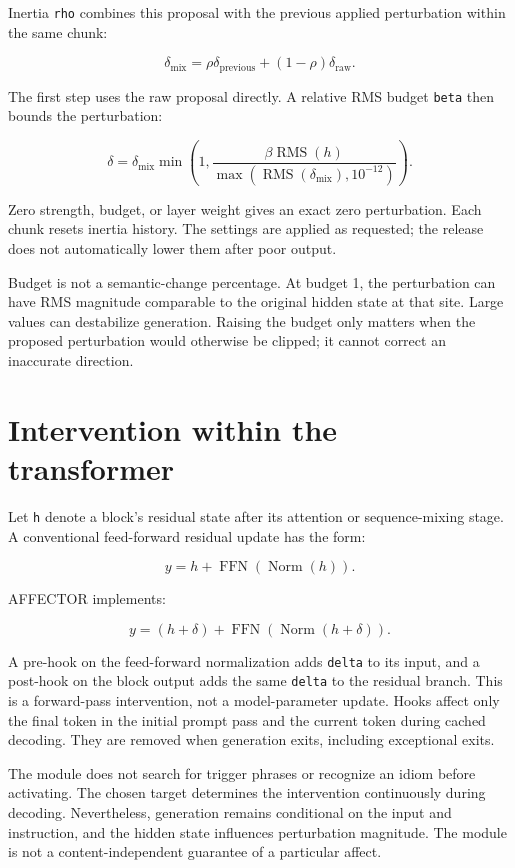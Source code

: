 \documentclass[manuscript,screen,nonacm]{acmart}
\begin{document}
Inertia \nolinkurl{rho} combines this proposal with the previous applied
perturbation within the same chunk:

\[\delta_{\mathrm{mix}}=\rho\delta_{\mathrm{previous}}+(1-\rho)\delta_{\mathrm{raw}}.\]

The first step uses the raw proposal directly. A relative RMS budget
\nolinkurl{beta} then bounds the perturbation:

\[\delta=\delta_{\mathrm{mix}}\min\left(1,\frac{\beta\operatorname{RMS}(h)}{\max(\operatorname{RMS}(\delta_{\mathrm{mix}}),10^{-12})}\right).\]

Zero strength, budget, or layer weight gives an exact zero perturbation.
Each chunk resets inertia history. The settings are applied as
requested; the release does not automatically lower them after poor
output.

Budget is not a semantic-change percentage. At budget 1, the
perturbation can have RMS magnitude comparable to the original hidden
state at that site. Large values can destabilize generation. Raising the
budget only matters when the proposed perturbation would otherwise be
clipped; it cannot correct an inaccurate direction.


\section{Intervention within the
transformer}\label{intervention-within-the-transformer}

Let \nolinkurl{h} denote a block's residual state after its attention or
sequence-mixing stage. A conventional feed-forward residual update has
the form:

\[y=h+\operatorname{FFN}(\operatorname{Norm}(h)).\]

AFFECTOR implements:

\[y=(h+\delta)+\operatorname{FFN}(\operatorname{Norm}(h+\delta)).\]

A pre-hook on the feed-forward normalization adds \nolinkurl{delta} to its
input, and a post-hook on the block output adds the same \nolinkurl{delta}
to the residual branch. This is a forward-pass intervention, not a
model-parameter update. Hooks affect only the final token in the initial
prompt pass and the current token during cached decoding. They are
removed when generation exits, including exceptional exits.

The module does not search for trigger phrases or recognize an idiom
before activating. The chosen target determines the intervention
continuously during decoding. Nevertheless, generation remains
conditional on the input and instruction, and the hidden state
influences perturbation magnitude. The module is not a
content-independent guarantee of a particular affect.
\end{document}

